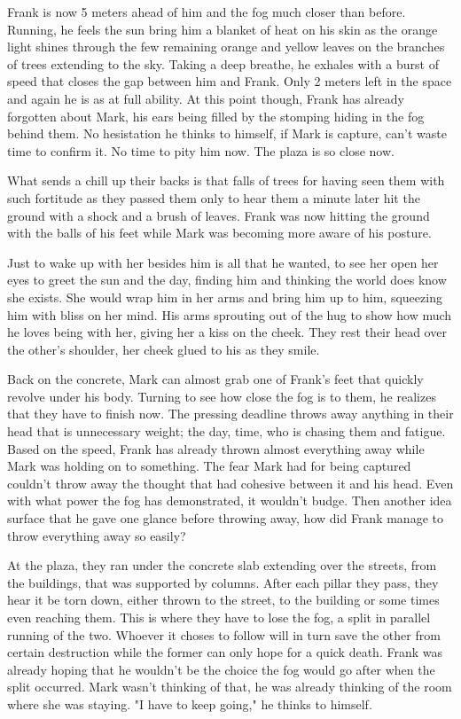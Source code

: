 \begin{Document}
        Frank is now 5 meters ahead of him and the fog much closer than before. Running, he feels the sun bring him a blanket of heat on his skin as the
    orange light shines through the few remaining orange and yellow leaves on the branches of trees extending to the sky. Taking a deep breathe, he
    exhales with a burst of speed that closes the gap between him and Frank. Only 2 meters left in the space and again he is as at full ability. At this
    point though, Frank has already forgotten about Mark, his ears being filled by the stomping hiding in the fog behind them. No hesistation he thinks to
    himself, if Mark is capture, can't waste time to confirm it. No time to pity him now. The plaza is so close now.

       What sends a chill up their backs is that falls of trees for having seen them with such fortitude as they passed them only to hear them a minute later
    hit the ground with a shock and a brush of leaves. Frank was now hitting the ground with the balls of his feet while Mark was becoming more aware of his
    posture.

        Just to wake up with her besides him is all that he wanted, to see her open her eyes to greet the sun and the day, finding him and thinking the world
    does know she exists. She would wrap him in her arms and bring him up to him, squeezing him with bliss on her mind. His arms sprouting out of the hug to
    show how much he loves being with her, giving her a kiss on the cheek. They rest their head over the other's shoulder, her cheek glued to his as they
    smile.

        Back on the concrete, Mark can almost grab one of Frank's feet that quickly revolve under his body. Turning to see how close the fog is to them, he
    realizes that they have to finish now. The pressing deadline throws away anything in their head that is unnecessary weight; the day, time, who is chasing
    them and fatigue. Based on the speed, Frank has already thrown almost everything away while Mark was holding on to something. The fear Mark had for being
    captured couldn't throw away the thought that had cohesive between it and his head. Even with what power the fog has demonstrated, it wouldn't budge. Then
    another idea surface that he gave one glance before throwing away, how did Frank manage to throw everything away so easily?

        At the plaza, they ran under the concrete slab extending over the streets, from the buildings, that was supported by columns. After each pillar they pass,
    they hear it be torn down, either thrown to the street, to the building or some times even reaching them. This is where they have to lose the fog, a split in
    parallel running of the two. Whoever it choses to follow will in turn save the other from certain destruction while the former can only hope for a quick death.
    Frank was already hoping that he wouldn't be the choice the fog would go after when the split occurred. Mark wasn't thinking of that, he was already thinking
    of the room where she was staying. "I have to keep going," he thinks to himself.


\end{Document}

